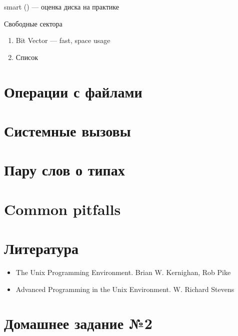 \documentclass[../lectures.tex]{subfiles}
\begin{document}
smart () --- оценка диска на практике

Свободные сектора
\begin{enumerate}
    \item Bit Vector --- fast, space usage
    \item Список
\end{enumerate}

\section{Операции с файлами}

\section{Системные вызовы}

\section{Пару слов о типах}

\section{Common pitfalls}

\section{Литература}
\begin{itemize}
    \item The Unix Programming Environment. Brian W. Kernighan, Rob Pike
    \item Advanced Programming in the Unix Environment. W. Richard Stevens
\end{itemize}

\section{Домашнее задание №2}
\end{document}
